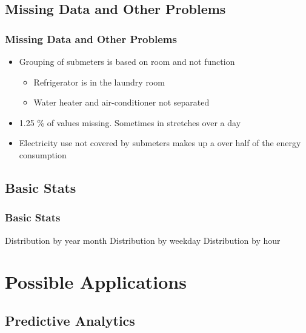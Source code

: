 \documentclass[10pt]{beamer}
\begin{document}
\subsection{Missing Data and Other Problems}
\begin{frame}
\frametitle{Missing Data and Other Problems}

\begin{itemize}
    \item Grouping of submeters is based on room and not function
    \begin{itemize}
        \item Refrigerator is in the laundry room
        \item Water heater and air-conditioner not separated
    \end{itemize}
    \item 1.25 \% of values missing. Sometimes in stretches over a day
    \item Electricity use not covered by submeters makes up a over half of the energy consumption
\end{itemize}


\end{frame}

\subsection{Basic Stats}

\begin{frame}
\frametitle{Basic Stats}

Distribution by year month
Distribution by weekday
Distribution by hour

\end{frame}


\section{Possible Applications}

\subsection{Predictive Analytics}
\end{document}

